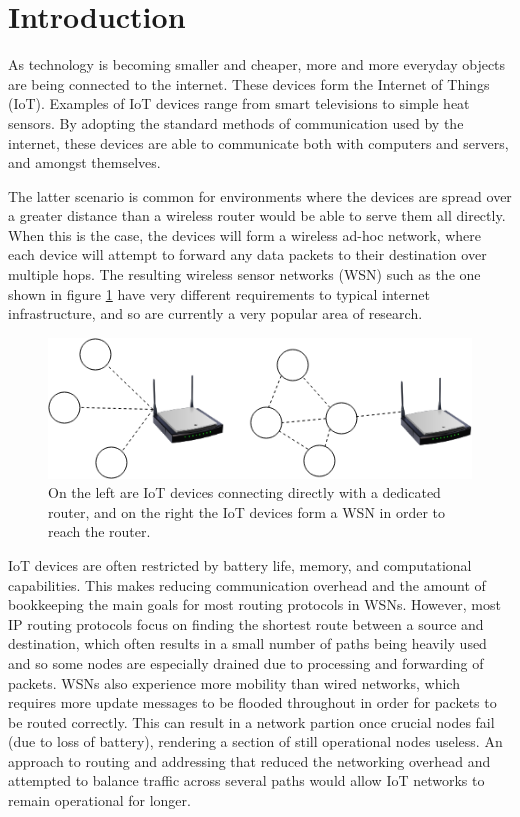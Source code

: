 \documentclass[12pt]{article}
\begin{document}
\newpage

\tableofcontents

\newpage
{}
\setcounter{page}{1} 

\section{Introduction}

As technology is becoming smaller and cheaper, more and more everyday objects are being connected to the internet. These devices form the Internet of Things (IoT). Examples of IoT devices range from smart televisions to simple heat sensors. By adopting the standard methods of communication used by the internet, these devices are able to communicate both with computers and servers, and amongst themselves. 

The latter scenario is common for environments where the devices are spread over a greater distance than a wireless router would be able to serve them all directly. When this is the case, the devices will form a wireless ad-hoc network, where each device will attempt to forward any data packets to their destination over multiple hops. The resulting wireless sensor networks (WSN) such as the one shown in figure \ref{fig:wsn}  have very different requirements to typical internet infrastructure, and so are currently a very popular area of research. 

\begin{figure}[!ht]
	\centering
	\includegraphics[width=\linewidth]{images/wsn}
	\caption{On the left are IoT devices connecting directly with a dedicated router, and on the right the IoT devices form a WSN in order to reach the router.}
	\label{fig:wsn}
\end{figure}

IoT devices are often restricted by battery life, memory, and computational capabilities. This makes reducing communication overhead and the amount of bookkeeping the main goals for most routing protocols in WSNs. However, most IP routing protocols focus on finding the shortest route between a source and destination, which often results in a small number of paths being heavily used and so some nodes are especially drained due to processing and forwarding of packets. WSNs also experience more mobility than wired networks, which requires more update messages to be flooded throughout in order for packets to be routed correctly. This can result in a network partion once crucial nodes fail (due to loss of battery), rendering a section of still operational nodes useless. An approach to routing and addressing that reduced the networking overhead and attempted to balance traffic across several paths would allow IoT networks to remain operational for longer. 
\end{document}
